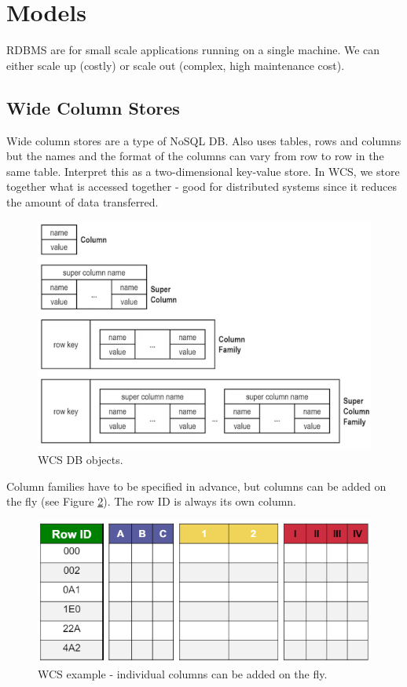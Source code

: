 \section{Models}

RDBMS are for small scale applications running on a single machine. We can either scale up (costly) or scale out (complex, high maintenance cost).



\subsection{Wide Column Stores}

Wide column stores are a type of NoSQL DB. Also uses tables, rows and columns but the names and the format of the columns can vary from row to row in the same table. Interpret this as a two-dimensional key-value store. In WCS, we store together what is accessed together - good for distributed systems since it reduces the amount of data transferred.

\begin{figure}[h]
	\centering
	\includegraphics[scale=0.6]{images/3-terminology.PNG}
	\caption{WCS DB objects.}
	\label{fig:term}
\end{figure}

Column families have to be specified in advance, but columns can be added on the fly (see Figure \ref{fig:wcs_ex}). The row ID is always its own column. %

\begin{figure}[h]
	\centering
	\includegraphics[scale=0.6]{images/3-wcs_ex.PNG}
	\caption{WCS example - individual columns can be added on the fly.}
	\label{fig:wcs_ex}
\end{figure}

